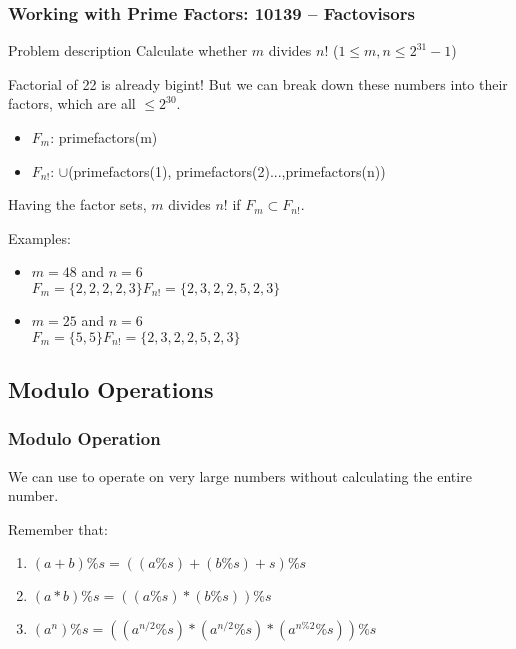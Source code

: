 \documentclass{beamer}
\begin{document}
\begin{frame}
  \frametitle{Working with Prime Factors: 10139 -- Factovisors}

  {\smaller
    \begin{block}{Problem description}
      Calculate whether $m$ divides $n!$ ($1 \leq m,n \leq 2^{31}-1$)
    \end{block}

    Factorial of 22 is already bigint! But we can break down these numbers into their 
    factors, which are all $\leq 2^{30}$.

    \begin{itemize}
    \item $F_m$: primefactors(m)
    \item $F_{n!}$: $\cup$(primefactors(1), primefactors(2)...,primefactors(n))
    \end{itemize}

    Having the factor sets, $m$ divides $n!$ if $F_m \subset F_{n!}$.

    \bigskip

    Examples:
    \begin{itemize}
    \item $m = 48$ and $n=6$\\
      $F_m = \{2,2,2,2,3\} F_{n!} = \{2,3,2,2,5,2,3\}$
  
  \medskip

    \item $m = 25$ and $n = 6$\\
      $F_m = \{5,5\} F_{n!} = \{2,3,2,2,5,2,3\}$

    \end{itemize}
  }
\end{frame}

\subsection{Modulo Operations}
\begin{frame}
  \frametitle{Modulo Operation} 

  {\smaller
  We can use  to operate on very large
  numbers without calculating the entire number.

  \bigskip

  Remember that:
  \begin{enumerate}
  \item $(a+b)\%s = ((a\%s)+(b\%s)+s)\%s$
  \item $(a*b)\%s = ((a\%s)*(b\%s))\%s$
  \item $(a^n)\%s = ((a^{n/2}\%s)*(a^{n/2}\%s)*(a^{n\%2}\%s))\%s$
  \end{enumerate}

  }
\end{frame}
\end{document}
